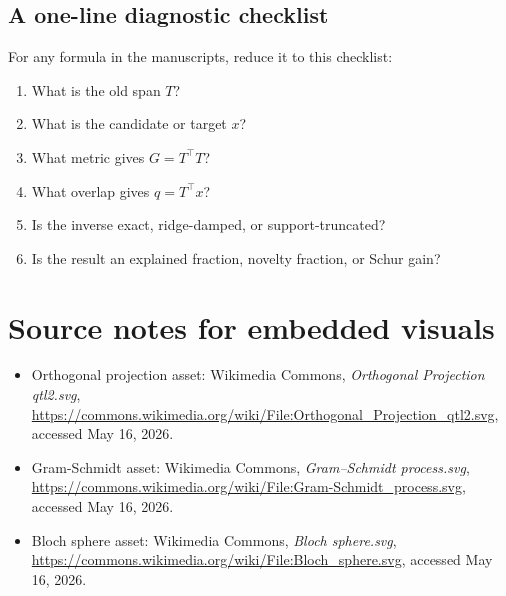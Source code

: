 \documentclass[10pt,twocolumn]{article}
\begin{document}
\subsection{A one-line diagnostic checklist}

For any formula in the manuscripts, reduce it to this checklist:
\begin{enumerate}
\item What is the old span \(T\)?
\item What is the candidate or target \(x\)?
\item What metric gives \(G=T^\top T\)?
\item What overlap gives \(q=T^\top x\)?
\item Is the inverse exact, ridge-damped, or support-truncated?
\item Is the result an explained fraction, novelty fraction, or Schur gain?
\end{enumerate}

\section{Source notes for embedded visuals}

\begin{itemize}
\item Orthogonal projection asset: Wikimedia Commons, \emph{Orthogonal Projection qtl2.svg}, \url{https://commons.wikimedia.org/wiki/File:Orthogonal_Projection_qtl2.svg}, accessed May 16, 2026.
\item Gram-Schmidt asset: Wikimedia Commons, \emph{Gram--Schmidt process.svg}, \url{https://commons.wikimedia.org/wiki/File:Gram-Schmidt_process.svg}, accessed May 16, 2026.
\item Bloch sphere asset: Wikimedia Commons, \emph{Bloch sphere.svg}, \url{https://commons.wikimedia.org/wiki/File:Bloch_sphere.svg}, accessed May 16, 2026.
\end{itemize}
\end{document}
